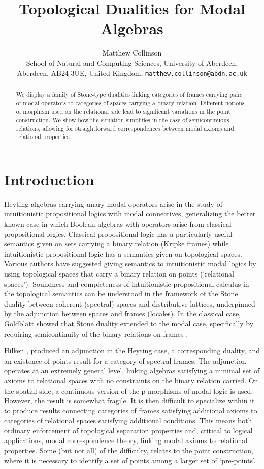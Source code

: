 \documentclass{article}[a4paper]
\title{Topological Dualities for Modal Algebras}
\author{
Matthew Collinson\\ 
\small{School of Natural and Computing Sciences},
University of Aberdeen,\\
\small{Aberdeen, AB24 3UE, United Kingdom,}
\texttt{\small{matthew.collinson@abdn.ac.uk}}
}
\date{} %
\theoremstyle{definition}
\begin{document}
\maketitle

\begin{abstract}
    We display a family of Stone-type dualities linking categories of frames carrying pairs of modal operators to categories of spaces carrying a binary relation. Different notions of morphism used on the relational side lead to significant variations in the point construction. We show how the situation simplifies in the case of semicontinuous relations, allowing for straightforward correspondences between modal axioms and relational properties. 
\end{abstract}

\section{Introduction}

Heyting algebras carrying unary modal operators arise in the study of intuitionistic propositional logics with modal connectives, generalizing the better known case in which Boolean algebras with operators arise from classical propositional logics. Classical propositional logic has a particularly useful semantics given on sets carrying a binary relation (Kripke frames) while intuitionistic propositional logic has a semantics given on topological spaces. Various authors have suggested giving semantics to intuitionistic modal logics by using topological spaces that carry a binary relation on points (`relational spaces'). Soundness and completeness of intuitionistic propositional calculus in the topological semantics can be understood in the framework of the Stone duality between coherent (spectral) spaces and distributive lattices, underpinned by the adjunction between spaces and frames (locales). In the classical case, Goldblatt showed that Stone duality extended to the modal case, specifically by requiring  semicontinuity of the binary relations on frames \cite{gold76a}. 

Hilken \cite{hil96},\cite{hil00} produced an adjunction in the Heyting case, a corresponding duality, and an existence of points result for a category of spectral frames.  The adjunction operates at an extremely general level, linking algebras satisfying a minimal set of axioms to relational spaces with no constraints on the binary relation carried. 
On the spatial side, a continuous version of the p-morphisms  of modal logic is used. 
However, the result is somewhat fragile. 
It is then difficult to specialize within it to produce results connecting categories of frames satisfying additional axioms to categories of relational spaces satisfying additional conditions. This means both ordinary enforcement of topological separation properties and, critical to logical applications,  modal correspondence theory, linking modal axioms to relational properties. 
Some (but not all) of the difficulty, relates to the point construction, where it is necessary to identify a set of points among a larger set of `pre-points'.
\end{document}
